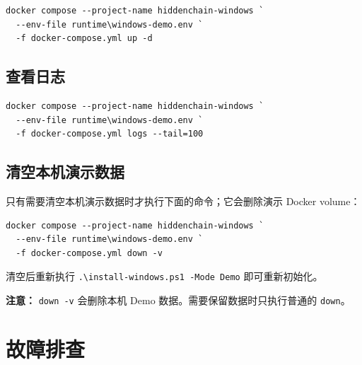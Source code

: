 \documentclass[UTF8,a4paper,zihao=-4,oneside]{ctexart}
\begin{document}
\begin{lstlisting}
docker compose --project-name hiddenchain-windows `
  --env-file runtime\windows-demo.env `
  -f docker-compose.yml up -d
\end{lstlisting}

\subsection{查看日志}

\begin{lstlisting}
docker compose --project-name hiddenchain-windows `
  --env-file runtime\windows-demo.env `
  -f docker-compose.yml logs --tail=100
\end{lstlisting}

\subsection{清空本机演示数据}

只有需要清空本机演示数据时才执行下面的命令；它会删除演示 Docker volume：

\begin{lstlisting}
docker compose --project-name hiddenchain-windows `
  --env-file runtime\windows-demo.env `
  -f docker-compose.yml down -v
\end{lstlisting}

清空后重新执行 \texttt{.\textbackslash install-windows.ps1 -Mode Demo} 即可重新初始化。

\begin{warningbox}
  \textbf{注意：} \texttt{down -v} 会删除本机 Demo 数据。需要保留数据时只执行普通的 \texttt{down}。
\end{warningbox}

\section{故障排查}
\end{document}
